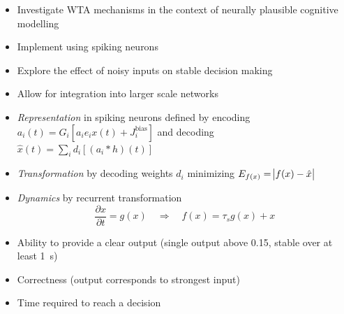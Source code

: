 \documentclass[final]{beamer}
\begin{document}
\begin{frame}[t]
    \begin{tcbraster}[raster columns=4, raster column skip=10mm, raster row skip=10mm, raster equal height=rows, raster force size=false]
        \begin{tcolorbox}[adjusted title=Motivation, add to width=-2cm]
            \begin{itemize}
                \item Investigate WTA mechanisms in the context of neurally plausible cognitive modelling
                \item Implement using spiking neurons
                \item Explore the effect of noisy inputs on stable decision making
                \item Allow for integration into larger scale networks
            \end{itemize}
        \end{tcolorbox}
        \begin{tcolorbox}[adjusted title=Neural Engineering Framework, add to width=5cm]
            \begin{itemize}
                \item \emph{Representation} in spiking neurons defined by encoding
                        $a_i(t) = G_i\left[a_i e_i x(t) + J_i^{\mathrm{bias}} \right]$
                        and decoding
                        $\hat{x}(t) = \sum_i d_i \left[(a_i * h)(t) \right]$
                \item \emph{Transformation} by decoding weights $d_i$ minimizing $E_{f(x)} = \abs{f(x) - \hat{x}}$
                \item \emph{Dynamics} by recurrent transformation
                    \begin{equation*}
                        \frac{\partial x}{\partial t} = g(x) \quad\Rightarrow\quad f(x) = \tau_s g(x) + x
                    \end{equation*}
            \end{itemize}
        \end{tcolorbox}
        \begin{tcolorbox}[adjusted title=Benchmarks, add to width=-3cm]
            \begin{itemize}
                \item Ability to provide a clear output (single output above \num{0.15}, stable over at least \SI{1}{\second})
                \item Correctness (output corresponds to strongest input)
                \item Time required to reach a decision

\end{itemize}
\end{tcolorbox}
\end{tcbraster}
\end{frame}
\end{document}
